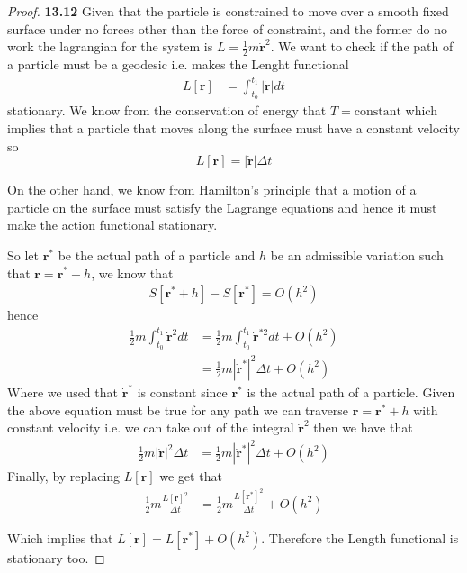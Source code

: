 \documentclass[11pt]{article}
\theoremstyle{definition}
\begin{document}
\begin{proof}{\textbf{13.12}}
    Given that the particle is constrained to move over a smooth fixed surface
    under no forces other than the force of constraint, and the former do no work
    the lagrangian for the system is $L = \frac{1}{2}m\bm{\dot{r}}^2$.
    We want to check if the path of a particle must be a geodesic i.e.
    makes the Lenght functional
    \begin{align*}
        L[\bm{r}] &= \int_{t_0}^{t_1} |\bm{\dot{r}}| dt
    \end{align*}
    stationary. We know from the conservation of energy that
    $T = \text{constant}$ which implies that a particle that moves along the
    surface must have a constant velocity
    so
    $$L[\bm{r}] = |\bm{\dot{r}}| \Delta t $$
    
    On the other hand, we know from Hamilton's principle that a
    motion of a particle on the surface must satisfy the Lagrange equations
    and hence it must make the action functional stationary.

    So let $\bm{r}^*$ be the actual path of a particle and $h$ be
    an admissible variation such that $\bm{r} = \bm{r}^* + h$, we know that
    \begin{align*}
        S[\bm{r}^* + h] - S[\bm{r}^*] = O(h^2)
    \end{align*}
    hence
    \begin{align*}
        \frac{1}{2}m\int_{t_0}^{t_1} \bm{\dot{r}}^2 dt &= 
        \frac{1}{2}m\int_{t_0}^{t_1} \bm{\dot{r}}^{*2} dt + 
        O(h^2)\\
        &= \frac{1}{2}m |\bm{\dot{r}}^*|^2\Delta t +  O(h^2)
    \end{align*}
    Where we used that $\bm{\dot{r}^*}$ is constant since $\bm{r^*}$ is the
    actual path of a particle.
    Given the above equation
    must be true for any path we can traverse $\bm{r} = \bm{r^*} + h$
    with constant velocity i.e. we can take out of the integral $\bm{\dot{r}}^2$
    then we have that
    \begin{align*}
        \frac{1}{2}m |\bm{\dot{r}}|^2\Delta t
        &= \frac{1}{2}m |\bm{\dot{r}}^*|^2\Delta t +  O(h^2) 
    \end{align*}
    Finally, by replacing $L[\bm{r}]$ we get that
    \begin{align*}
        \frac{1}{2}m \frac{L[\bm{r}]^2}{\Delta t}
        &= \frac{1}{2}m \frac{L[\bm{r^*}]^2}{\Delta t} +  O(h^2) 
    \end{align*}

    Which implies that $L[\bm{r}] = L[\bm{r}^*] + O(h^2)$.
    Therefore the Length functional is stationary too.
\end{proof}
\end{document}
